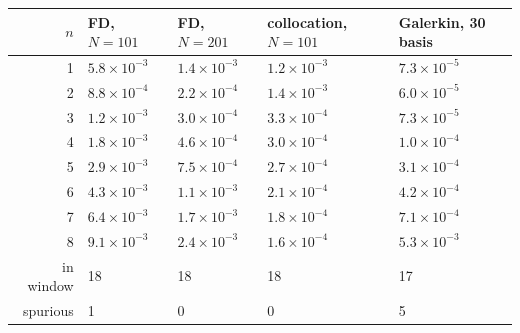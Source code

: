 \begin{tabular}{rllll}
\toprule
$n$ & FD, $N=101$ & FD, $N=201$ & collocation, $N=101$ & Galerkin, 30 basis\\
\midrule
1 & $5.8\times10^{-3}$ & $1.4\times10^{-3}$ & $1.2\times10^{-3}$ & $7.3\times10^{-5}$\\
2 & $8.8\times10^{-4}$ & $2.2\times10^{-4}$ & $1.4\times10^{-3}$ & $6.0\times10^{-5}$\\
3 & $1.2\times10^{-3}$ & $3.0\times10^{-4}$ & $3.3\times10^{-4}$ & $7.3\times10^{-5}$\\
4 & $1.8\times10^{-3}$ & $4.6\times10^{-4}$ & $3.0\times10^{-4}$ & $1.0\times10^{-4}$\\
5 & $2.9\times10^{-3}$ & $7.5\times10^{-4}$ & $2.7\times10^{-4}$ & $3.1\times10^{-4}$\\
6 & $4.3\times10^{-3}$ & $1.1\times10^{-3}$ & $2.1\times10^{-4}$ & $4.2\times10^{-4}$\\
7 & $6.4\times10^{-3}$ & $1.7\times10^{-3}$ & $1.8\times10^{-4}$ & $7.1\times10^{-4}$\\
8 & $9.1\times10^{-3}$ & $2.4\times10^{-3}$ & $1.6\times10^{-4}$ & $5.3\times10^{-3}$\\
\midrule
in window & 18 & 18 & 18 & 17\\
spurious & 1 & 0 & 0 & 5\\
\bottomrule
\end{tabular}
